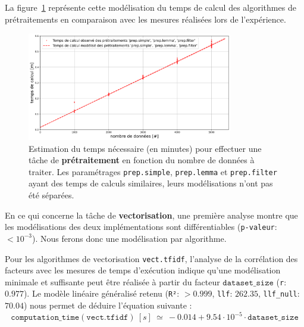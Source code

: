 			La figure~\ref{figure:4.3.2-ETUDE-COUTS-TEMPS-CALCUL-MODELISATION-PREPROCESSING} représente cette modélisation du temps de calcul des algorithmes de prétraitements en comparaison avec les mesures réalisées lors de l'expérience.
			\newline
			\begin{figure}[!htb]
				\centering
				\includegraphics[width=0.8\textwidth]{figures/etude-temps-calcul-modelisation-1prep}
				\caption{Estimation du temps nécessaire (en minutes) pour effectuer une tâche de \textbf{prétraitement} en fonction du nombre de données à traiter. Les paramétrages \texttt{prep.simple}, \texttt{prep.lemma} et \texttt{prep.filter} ayant des temps de calculs similaires, leurs modélisations n'ont pas été séparées.}
				\label{figure:4.3.2-ETUDE-COUTS-TEMPS-CALCUL-MODELISATION-PREPROCESSING}
			\end{figure}
			
			
			En ce qui concerne la tâche de \textbf{vectorisation}, une première analyse montre que les modélisations des deux implémentations sont différentiables  (\texttt{p-valeur}: $< 10^{-3}$). Nous ferons donc une modélisation par algorithme.
		
			Pour les algorithmes de vectorisation \texttt{vect.tfidf}, l'analyse de la corrélation des facteurs avec les mesures de temps d'exécution indique qu'une modélisation minimale et suffisante peut être réalisée à partir du facteur $\texttt{dataset\_size}$ (\texttt{r}: $0.977$).
			Le modèle linéaire généralisé retenu (\texttt{R²}: $> 0.999$, \texttt{llf}: $262.35$, \texttt{llf\_null}: $70.04$) nous permet de déduire l'équation suivante :
			\begin{equation}
				\texttt{computation\_time}(\texttt{vect.tfidf})~[s]~
				\simeq~-0.014 + 9.54 \cdot 10^{-5} \cdot \texttt{dataset\_size}
			\end{equation}
			
